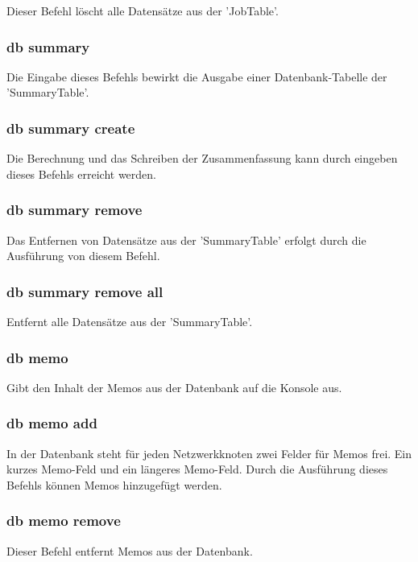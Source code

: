 \documentclass[12pt,a4paper]{report}
\begin{document}
\begin{onehalfspace}
Dieser Befehl löscht alle Datensätze aus der 'JobTable'.

\subsubsection{db summary}

Die Eingabe dieses Befehls bewirkt die Ausgabe einer Datenbank-Tabelle der 'SummaryTable'.

\subsubsection{db summary create}

Die Berechnung und das Schreiben der Zusammenfassung kann durch eingeben dieses Befehls erreicht werden.

\subsubsection{db summary remove}

Das Entfernen von Datensätze aus der 'SummaryTable' erfolgt durch die Ausführung von diesem Befehl.

\subsubsection{db summary remove all}

Entfernt alle Datensätze aus der 'SummaryTable'.

\subsubsection{db memo}

Gibt den Inhalt der Memos aus der Datenbank auf die Konsole aus.

\subsubsection{db memo add}

In der Datenbank steht für jeden Netzwerkknoten zwei Felder für Memos frei. Ein kurzes Memo-Feld und ein längeres Memo-Feld. Durch die Ausführung dieses Befehls können Memos hinzugefügt werden.

\subsubsection{db memo remove}

Dieser Befehl entfernt Memos aus der Datenbank.


\end{onehalfspace}
\end{document}
